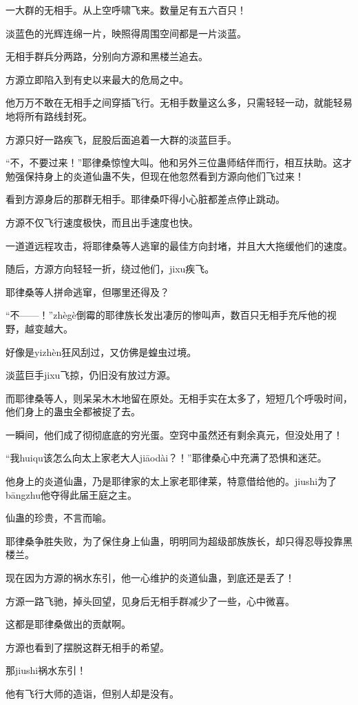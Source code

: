 \begin{this_body}
一大群的无相手。从上空呼啸飞来。数量足有五六百只！

淡蓝色的光辉连绵一片，映照得周围空间都是一片淡蓝。

无相手群兵分两路，分别向方源和黑楼兰追去。

方源立即陷入到有史以来最大的危局之中。

他万万不敢在无相手之间穿插飞行。无相手数量这么多，只需轻轻一动，就能轻易地将所有路线封死。

方源只好一路疾飞，屁股后面追着一大群的淡蓝巨手。

“不，不要过来！”耶律桑惊惶大叫。他和另外三位蛊师结伴而行，相互扶助。这才勉强保持身上的炎道仙蛊不失，但现在他忽然看到方源向他们飞过来！

看到方源身后的那群无相手。耶律桑吓得小心脏都差点停止跳动。

方源不仅飞行速度极快，而且出手速度也快。

一道道远程攻击，将耶律桑等人逃窜的最佳方向封堵，并且大大拖缓他们的速度。

随后，方源方向轻轻一折，绕过他们，jixu疾飞。

耶律桑等人拼命逃窜，但哪里还得及？

“不——！”zhègè倒霉的耶律族长发出凄厉的惨叫声，数百只无相手充斥他的视野，越变越大。

好像是yizhèn狂风刮过，又仿佛是蝗虫过境。

淡蓝巨手jixu飞掠，仍旧没有放过方源。

而耶律桑等人，则呆呆木木地留在原处。无相手实在太多了，短短几个呼吸时间，他们身上的蛊虫全都被捉了去。

一瞬间，他们成了彻彻底底的穷光蛋。空窍中虽然还有剩余真元，但没处用了！

“我huiqu该怎么向太上家老大人jiāodài？！”耶律桑心中充满了恐惧和迷茫。

他身上的炎道仙蛊，乃是耶律家的太上家老耶律莱，特意借给他的。jiushi为了bāngzhu他夺得此届王庭之主。

仙蛊的珍贵，不言而喻。

耶律桑争胜失败，为了保住身上仙蛊，明明同为超级部族族长，却只得忍辱投靠黑楼兰。

现在因为方源的祸水东引，他一心维护的炎道仙蛊，到底还是丢了！

方源一路飞驰，掉头回望，见身后无相手群减少了一些，心中微喜。

这都是耶律桑做出的贡献啊。

方源也看到了摆脱这群无相手的希望。

那jiushi祸水东引！

他有飞行大师的造诣，但别人却是没有。


\end{this_body}
